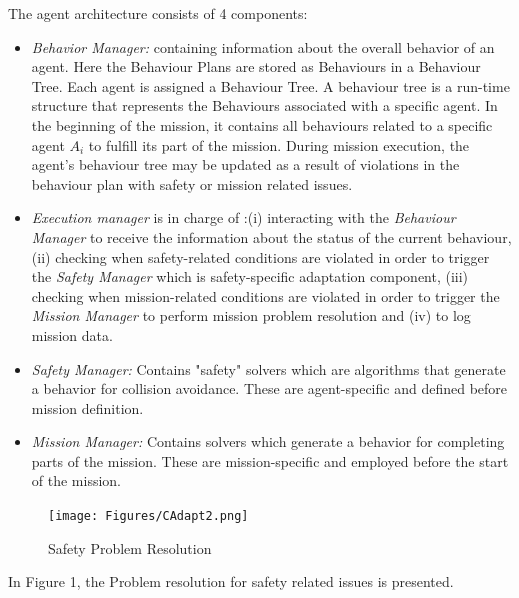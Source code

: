 \documentclass[journal]{IEEEtran}
\theoremstyle{definition}
\newcommand\patrizio[1]{\nb{Patrizio}{#1}}
\begin{document}
The agent architecture consists of 4 components:
\begin{itemize}
    \item \textit{Behavior Manager:} containing information about the overall behavior of an agent. Here the Behaviour Plans are stored as Behaviours in a Behaviour Tree. Each agent is assigned a Behaviour Tree. A behaviour tree is a run-time structure that represents the Behaviours associated with a specific agent. In the beginning of the mission, it contains all behaviours related to a specific agent $A_i$ to fulfill its part of the mission. During mission execution, the agent's behaviour tree may be updated as a result of violations in the behaviour plan with safety or mission related issues.
    \item \textit{Execution manager} is in charge of :(i) interacting with the \textit{Behaviour Manager} to receive the information about the status of the current behaviour, (ii) checking when safety-related conditions are violated in order to trigger the \textit{Safety Manager} which is safety-specific adaptation component, (iii) checking when mission-related conditions are violated in order to trigger the \textit{Mission Manager} to perform mission problem resolution and (iv) to log mission data.
    \item \textit{Safety Manager:} Contains "safety" solvers which are algorithms that generate a behavior for collision avoidance. These are agent-specific and defined before mission definition.
    \item \textit{Mission Manager:} Contains solvers which generate a behavior for completing parts of the mission. These are mission-specific and employed  before the start of the mission.  
\end{itemize}



\begin{figure}[h]
\texttt{[image: Figures/CAdapt2.png]}
\caption{Safety Problem Resolution\patrizio{unreadable}}
\end{figure}







In Figure 1, the Problem resolution for safety related issues is presented.
\end{document}

